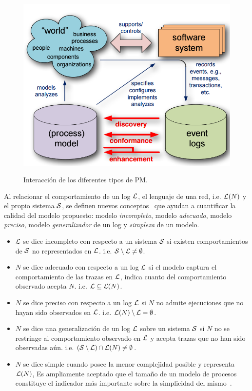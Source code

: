 \begin{figure}[t]
  	\centering
    \includegraphics[scale=0.5]{img/pmcycle.png}\\
    \caption{Interacción de los diferentes tipos de PM.}
    \label{fig:pmcycle}
\end{figure}

Al relacionar el comportamiento de un log ${\mathcal L}$, el lenguaje de una red, i.e. $\mathcal{L}(N)$ y 
el propio sistema $\mathcal{S}$, se definen nuevos conceptos~\cite{BuijsDA14}
que ayudan a cuantificar la calidad del modelo propuesto: modelo \emph{incompleto},
modelo \emph{adecuado}, modelo \emph{preciso}, modelo \emph{generalizador} de un log y \emph{simpleza} de un modelo.

\begin{itemize}
  \item ${\mathcal L}$ se dice incompleto con respecto a un sistema $\mathcal{S}$ si existen comportamientos
        de $\mathcal{S}$ no representados en ${\mathcal L}$.
        i.e. ${\mathcal{S}} \setminus {\mathcal L} \ne \emptyset$.
  \item $N$ se dice adecuado con respecto a un log ${\mathcal L}$ si el modelo captura el comportamiento 
        de las trazas en ${\mathcal L}$, indica cuanto del comportamiento observado acepta $N$. 
        i.e. ${\mathcal L} \subseteq \mathcal{L}(N)$.
  \item $N$ se dice preciso con respecto a un log ${\mathcal L}$ si $N$ no admite ejecuciones que no hayan
        sido observados en ${\mathcal L}$.
        i.e. $\mathcal{L}(N) \setminus {\mathcal L} = \emptyset$.
  \item $N$ se dice una generalización de un log ${\mathcal L}$ sobre un sistema $\mathcal{S}$ si $N$
        no se restringe al comportamiento observado en ${\mathcal L}$ y acepta trazas que no han sido observadas aún.
        i.e. $({\mathcal{S}} \setminus {\mathcal L}) \cap \mathcal{L}(N) \neq \emptyset$.
  \item $N$ se dice simple cuando posee la menor complejidad posible y representa $\mathcal{L}(N)$,
        Es ampliamente aceptado que el tamaño de un modelo de procesos constituye el indicador más importante
        sobre la simplicidad del mismo~\cite{AalstBook,Aalst2012,LeonRCHH15,CarmonaC14}.
\end{itemize}

